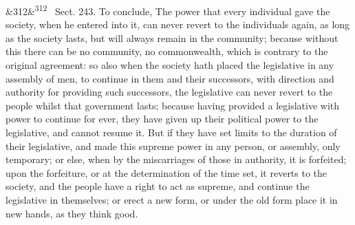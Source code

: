 \documentclass[12pt]{article}
\newcommand{\para}[1][]{\par\noindent\ifx&#1&\else\textsuperscript{\footnotesize #1}~\fi}
\begin{document}
\para[312] Sect. 243. To conclude, The power that every individual gave the society, when he entered into it, can never revert to the individuals again, as long as the society lasts, but will always remain in the community; because without this there can be no community, no commonwealth, which is contrary to the original agreement: so also when the society hath placed the legislative in any assembly of men, to continue in them and their successors, with direction and authority for providing such successors, the legislative can never revert to the people whilst that government lasts; because having provided a legislative with power to continue for ever, they have given up their political power to the legislative, and cannot resume it. But if they have set limits to the duration of their legislative, and made this supreme power in any person, or assembly, only temporary; or else, when by the miscarriages of those in authority, it is forfeited; upon the forfeiture, or at the determination of the time set, it reverts to the society, and the people have a right to act as supreme, and continue the legislative in themselves; or erect a new form, or under the old form place it in new hands, as they think good.

\end{document}
